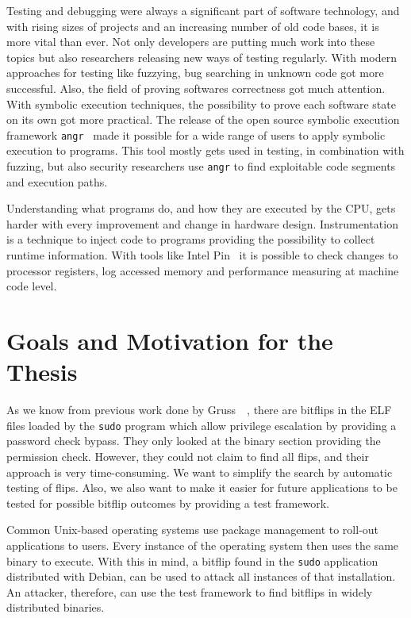 Testing and debugging were always a significant part of software technology, and
with rising sizes of projects and an increasing number of old code bases, it is
more vital than ever. Not only developers are putting much work into these
topics but also researchers releasing new ways of testing regularly. With modern
approaches for testing like fuzzying, bug searching in unknown code got more
successful. Also, the field of proving software\textquotesingle s correctness
got much attention. With symbolic execution techniques, the possibility to prove
each software state on its own got more practical. The release of the open
source symbolic execution framework \texttt{angr}~\cite{angrpaper} made it
possible for a wide range of users to apply symbolic execution to programs. This
tool mostly gets used in testing, in combination with fuzzing, but also security
researchers use \texttt{angr} to find exploitable code segments and execution
paths.

Understanding what programs do, and how they are executed by the CPU, gets
harder with every improvement and change in hardware design. Instrumentation is
a technique to inject code to programs providing the possibility to collect
runtime information. With tools like Intel Pin~\cite{pintool} it is possible to
check changes to processor registers, log accessed memory and performance
measuring at machine code level.

\section{Goals and Motivation for the Thesis}

As we know from previous work done by Gruss~\etal~\cite{flipinthewall}, there
are bitflips in the ELF files loaded by the \texttt{sudo} program which allow
privilege escalation by providing a password check bypass. They only looked at
the binary section providing the permission check. However, they could not claim
to find all flips, and their approach is very time-consuming. We want to
simplify the search by automatic testing of flips. Also, we also want to make it
easier for future applications to be tested for possible bitflip outcomes by
providing a test framework.

Common Unix-based operating systems use package management to roll-out
applications to users. Every instance of the operating system then uses the same
binary to execute. With this in mind, a bitflip found in the \texttt{sudo}
application distributed with Debian, can be used to attack all instances of that
installation. An attacker, therefore, can use the test framework to find
bitflips in widely distributed binaries.

